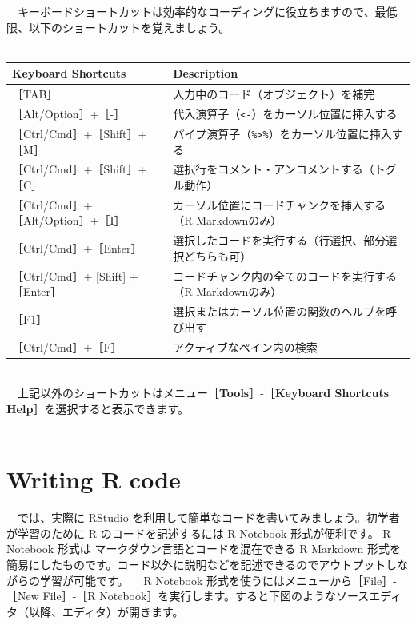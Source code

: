\documentclass[
  12pt,
]{book}
\begin{document}
　キーボードショートカットは効率的なコーディングに役立ちますので、最低限、以下のショートカットを覚えましょう。\\
　

\begin{longtable}[]{@{}ll@{}}
\toprule
Keyboard Shortcuts & Description \\
\midrule
\endhead
［TAB］ & 入力中のコード（オブジェクト）を補完 \\
［Alt/Option］+［-］ & 代入演算子（\texttt{\textless{}-}）をカーソル位置に挿入する \\
［Ctrl/Cmd］+［Shift］+［M］ & パイプ演算子（\texttt{\%\textgreater{}\%}）をカーソル位置に挿入する \\
［Ctrl/Cmd］+［Shift］+［C］ & 選択行をコメント・アンコメントする（トグル動作） \\
［Ctrl/Cmd］+［Alt/Option］+［I］ & カーソル位置にコードチャンクを挿入する（R Markdownのみ） \\
［Ctrl/Cmd］+［Enter］ & 選択したコードを実行する（行選択、部分選択どちらも可） \\
［Ctrl/Cmd］+ {[}Shift{]} +［Enter］ & コードチャンク内の全てのコードを実行する（R Markdownのみ） \\
［F1］ & 選択またはカーソル位置の関数のヘルプを呼び出す \\
［Ctrl/Cmd］+［F］ & アクティブなペイン内の検索 \\
\bottomrule
\end{longtable}

　\\
　上記以外のショートカットはメニュー［\textbf{Tools}］-［\textbf{Keyboard Shortcuts Help}］を選択すると表示できます。\\
　

\hypertarget{writing-r-code}{%
\section{Writing R code}\label{writing-r-code}}

　では、実際に RStudio を利用して簡単なコードを書いてみましょう。初学者が学習のために R のコードを記述するには R Notebook 形式が便利です。 R Notebook 形式は マークダウン言語とコードを混在できる R Markdown 形式を簡易にしたものです。コード以外に説明などを記述できるのでアウトプットしながらの学習が可能です。 　R Notebook 形式を使うにはメニューから［File］-［New File］-［R Notebook］を実行します。すると下図のようなソースエディタ（以降、エディタ）が開きます。
\end{document}
